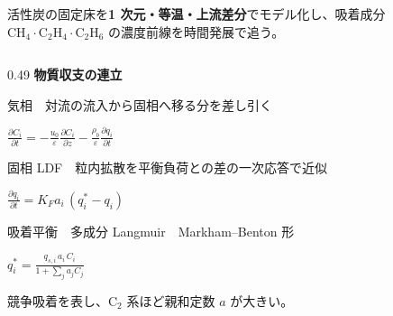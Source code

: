 \begin{frame}[t]

  \vspace*{2.4mm}
  {\footnotesize\raggedright
   活性炭の固定床を\textbf{1 次元・等温・上流差分}でモデル化し、吸着成分
   \mbox{$\mathrm{CH_4}\!\cdot\!\mathrm{C_2H_4}\!\cdot\!\mathrm{C_2H_6}$} の濃度前線を時間発展で追う。\par}

  \vspace{0.55em}

  \begin{columns}[T,onlytextwidth]
    \begin{column}{0.49\textwidth}
      {\bfseries 物質収支の連立}\par
      \vspace{0.5em}
      {\scriptsize 気相　対流の流入から固相へ移る分を差し引く}\par
      \vspace{0.15em}
      {\centering$\displaystyle
        \frac{\partial C_i}{\partial t}
          =-\frac{u_0}{\varepsilon}\frac{\partial C_i}{\partial z}
           -\frac{\rho_b}{\varepsilon}\frac{\partial q_i}{\partial t}$\par}
      \vspace{0.85em}
      {\scriptsize 固相 LDF　粒内拡散を平衡負荷との差の一次応答で近似}\par
      \vspace{0.15em}
      {\centering$\displaystyle \frac{\partial q_i}{\partial t}=K_F a_i\,(q_i^{*}-q_i)$\par}
      \vspace{0.85em}
      {\scriptsize 吸着平衡　多成分 Langmuir　Markham–Benton 形}\par
      \vspace{0.15em}
      {\centering$\displaystyle q_i^{*}=\frac{q_{s,i}\,a_i\,C_i}{1+\sum_j a_j C_j}$\par}
      \vspace{0.6em}
      {\scriptsize\color{black!55}\raggedright 競争吸着を表し、$\mathrm{C_2}$ 系ほど親和定数 $a$ が大きい。\par}
    \end{column}


\end{columns}
\end{frame}
